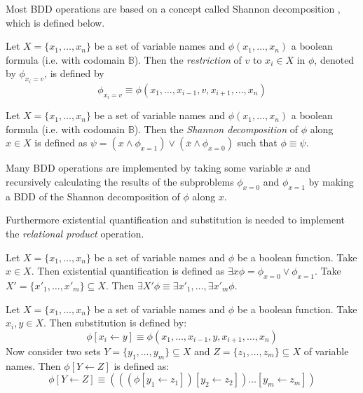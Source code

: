 Most BDD operations are based on a concept called Shannon decomposition \cite{dijk2012parallelization}, which is defined below.

\begin{definition}[Restriction]
	Let $X = \{ x_1, \dots, x_n \}$ be a set of variable names and $\phi(x_1, \dots, x_n)$ a boolean formula (i.e. with codomain $\mathbb{B}$). Then the \emph{restriction} of $v$ to $x_i \in X$ in $\phi$, denoted by $\phi_{x_i=v}$, is defined by 
	\begin{equation}
		\phi_{x_i=v} \equiv \phi(x_1, \dots, x_{i - 1}, v, x_{i + 1}, \dots, x_n)
	\end{equation}
\end{definition}

\begin{definition}
	Let $X = \{ x_1, \dots, x_n \}$ be a set of variable names and $\phi(x_1, \dots, x_n)$ a boolean formula (i.e. with codomain $\mathbb{B}$). Then the \emph{Shannon decomposition} of $\phi$ along $x \in X$ is defined as $\psi = (x \wedge \phi_{x=1}) \vee (\overline{x} \wedge \phi_{x=0})$ such that $\phi \equiv \psi$. 
\end{definition}

Many BDD operations are implemented by taking some variable $x$ and recursively calculating the results of the subproblems $\phi_{x=0}$ and $\phi_{x=1}$ by making a BDD of the Shannon decomposition of $\phi$ along $x$. 

Furthermore existential quantification and substitution is needed to implement the \emph{relational product} operation.

\begin{definition}
	Let $X = \{ x_1, \dots, x_n \}$ be a set of variable names and $\phi$ be a boolean function. Take $x \in X$. Then existential quantification is defined as $\exists x \phi = \phi_{x=0} \vee \phi_{x=1}$. Take $X' = \{ x'_1, \dots, x'_m \} \subseteq X$. Then $\exists X' \phi \equiv \exists x'_1, \dots, \exists x'_m \phi$.
\end{definition}

\begin{definition}[Substitution]
	Let $X = \{ x_1, \dots, x_n \}$ be a set of variable names and $\phi$ be a boolean function. Take $x_i, y \in X$. Then substitution is defined by:
	\begin{equation}
		\phi[x_i \gets y] \equiv \phi(x_1, \dots, x_{i - 1}, y, x_{i + 1}, \dots, x_n)
	\end{equation}
	Now consider two sets $Y = \{ y_1, \dots, y_m \} \subseteq X$ and $Z = \{ z_1, \dots, z_m \} \subseteq X$ of variable names. Then $\phi[Y \gets Z]$ is defined as:
	\begin{equation}
		\phi[Y \gets Z] \equiv (((\phi[y_1 \gets z_1])[y_2 \gets z_2]) \dots [y_m \gets z_m])
	\end{equation}
\end{definition}

